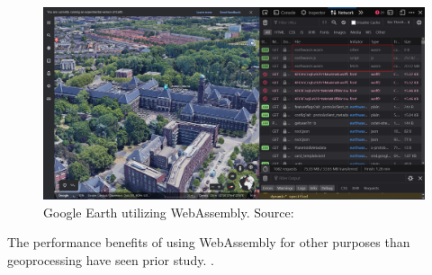 \begin{figure}[!tbp]
  \centering
  \begin{minipage}[b]{0.80\textwidth}
    \includegraphics[width=\textwidth]{../images/google-earth-uses-webassembly.PNG}
    \caption{Google Earth utilizing WebAssembly. Source: \cite{google_google_2020}}
    \label{fig:google-earth}
  \end{minipage}
\end{figure}



The performance benefits of using WebAssembly for other purposes than geoprocessing have seen prior study. \cite{jangda_not_2019}.








